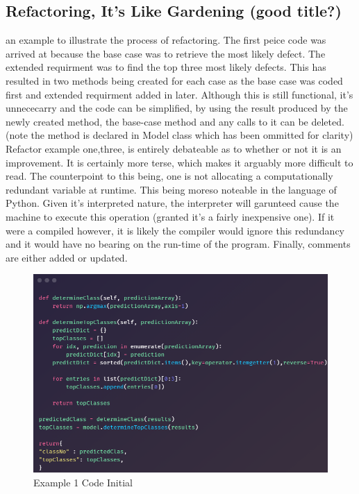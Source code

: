       \subsection{Refactoring, It's Like Gardening (good title?)}
      an example to illustrate the process of refactoring. The first peice code was arrived at because the base case was to retrieve the most likely defect. The extended requirment was to find the top three most likely defects. This has resulted in two methods being created for each case as the base case was coded first and extended requirment added in later. Although this is still functional, it's unnececarry and the code can be simplified, by using the result produced by the newly created method, the base-case method and any calls to it can be deleted. (note the method is declared in Model class which has been ommitted for clarity) Refactor example one,three, is entirely debateable as to whether or not it is an improvement. It is certainly more terse, which makes it arguably more difficult to read. The counterpoint to this being,  one is not allocating a computationally redundant variable at runtime. This being moreso noteable in the language of Python. Given it's interpreted nature, the interpreter will garunteed cause the machine to execute this operation (granted it's a fairly inexpensive one). If it were a compiled however, it is likely the compiler would ignore this redundancy and it would have no bearing on the run-time of the program. Finally, comments are either added or updated.

      \begin{figure}[H]
        \begin{center}
          \includegraphics[scale=0.55]{Images/Refactor/refactorA1}
          \caption{Example 1 Code Initial}
          \label{fig:refactorA1}
        \end{center}
      \end{figure}

